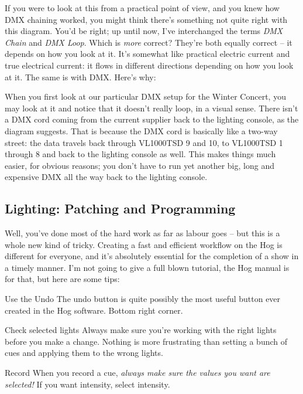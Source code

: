 \documentclass[letterpaper,10pt,oneside,headsepline]{scrreprt}
\begin{document}

If you were to look at this from a practical point of view, and you knew how DMX chaining worked, you might think there's something not quite right with this diagram. You'd be right; up until now, I've interchanged the terms \textit{DMX Chain} and \textit{DMX Loop}. Which is \textit{more} correct? They're both equally correct -- it depends on how you look at it. It's somewhat like practical electric current and true electrical current: it flows in different directions depending on how you look at it. The same is with DMX. Here's why:

When you first look at our particular DMX setup for the Winter Concert, you may look at it and notice that it doesn't really loop, in a visual sense. There isn't a DMX cord coming from the current supplier back to the lighting console, as the diagram suggests. That is because the DMX cord is basically like a two-way street: the data travels back through VL1000TSD 9 and 10, to VL1000TSD 1 through 8 and back to the lighting console as well. This makes things much easier, for obvious reasons; you don't have to run yet another big, long and expensive DMX all the way back to the lighting console. 

\subsection{Lighting: Patching and Programming}
Well, you've done most of the hard work as far as labour goes -- but this is a whole new kind of tricky. Creating a fast and efficient workflow on the Hog is different for everyone, and it's absolutely essential for the completion of a show in a timely manner. I'm not going to give a full blown tutorial, the Hog manual is for that, but here are some tips:\\

\begin{compactdesc}
\item[Use the Undo] The undo button is quite possibly the most useful button ever created in the Hog software. Bottom right corner.
\item[Check selected lights] Always make sure you're working with the right lights before you make a change. Nothing is more frustrating than setting a bunch of cues and applying them to the wrong lights.
\item[Record] When you record a cue, \textit{always make sure the values you want are selected!} If you want intensity, select intensity.\\
\end{compactdesc}
\end{document}
